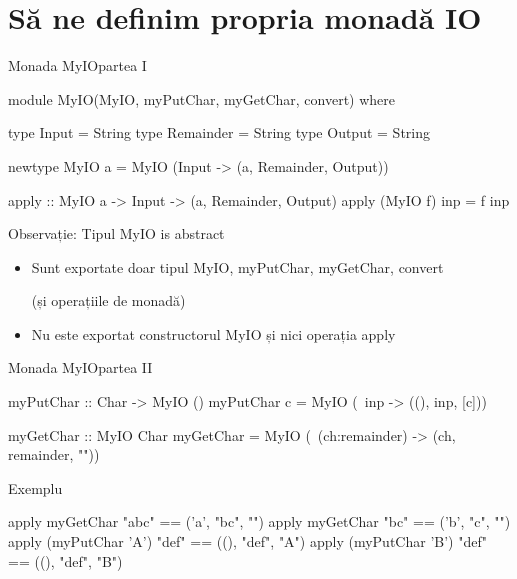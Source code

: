 \documentclass[xcolor=pdftex,romanian,colorlinks]{beamer}
\begin{document}




%

\section{Să ne definim propria monadă IO}


\begin{frame}[fragile]{Monada MyIO}{partea I}
\begin{asciihs}
   module MyIO(MyIO, myPutChar, myGetChar, convert) where

   type Input = String
   type Remainder = String
   type Output = String

   newtype MyIO a  =  MyIO (Input -> (a, Remainder, Output))

   apply :: MyIO a -> Input -> (a, Remainder, Output)
   apply (MyIO f) inp = f inp
\end{asciihs}

\begin{block}{Observație: Tipul MyIO is abstract}
\begin{itemize} 
\item Sunt exportate doar tipul MyIO, myPutChar, myGetChar, convert 

(și operațiile de monadă)
\item Nu este exportat constructorul MyIO și nici operația apply
\end{itemize}
\end{block} 
\end{frame}

%


\begin{frame}[fragile]{Monada MyIO}{partea II}
\begin{asciihs}
 myPutChar :: Char -> MyIO ()
 myPutChar c = MyIO (\ inp -> ((), inp, [c]))

 myGetChar :: MyIO Char
 myGetChar = MyIO (\ (ch:remainder) -> (ch, remainder, ""))
\end{asciihs}

\begin{block}
{Exemplu}
\begin{asciihs}
   apply myGetChar "abc" == ('a',    "bc", "")
   apply myGetChar "bc"   == ('b',   "c", "")
   apply (myPutChar 'A') "def" ==    ((), "def", "A")
   apply (myPutChar 'B') "def" ==    ((), "def", "B")
\end{asciihs}
\end{block}

\end{frame}
\end{document}
